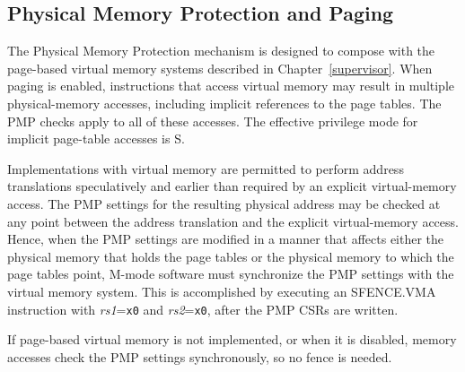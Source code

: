 \subsection{Physical Memory Protection and Paging}
\label{pmp-vmem}

The Physical Memory Protection mechanism is designed to compose with the
page-based virtual memory systems described in Chapter~\ref{supervisor}.  When
paging is enabled, instructions that access virtual memory may result in
multiple physical-memory accesses, including implicit references to the page
tables.  The PMP checks apply to all of these accesses.  The effective
privilege mode for implicit page-table accesses is S.

Implementations with virtual memory are permitted to perform address
translations speculatively and earlier than required by an explicit
virtual-memory access.  The PMP settings for the resulting physical address
may be checked at any point between the address translation and the explicit
virtual-memory access.  Hence, when the PMP settings are modified in a manner
that affects either the physical memory that holds the page tables or the
physical memory to which the page tables point, M-mode software must
synchronize the PMP settings with the virtual memory system.  This is
accomplished by executing an SFENCE.VMA instruction with {\em rs1}={\tt x0}
and {\em rs2}={\tt x0}, after the PMP CSRs are written.

If page-based virtual memory is not implemented, or when it is disabled,
memory accesses check the PMP settings synchronously, so no fence is needed.
